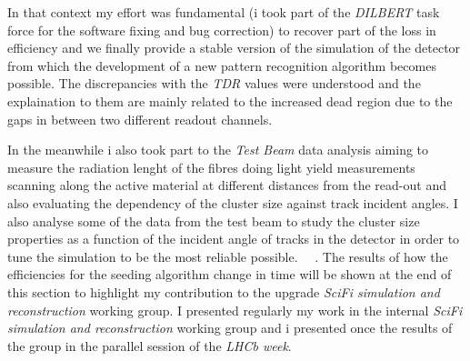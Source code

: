 \documentclass[paper=a4, fontsize=10pt]{scrartcl}
\numberwithin{equation}{section}		%
\numberwithin{figure}{section}			%
\numberwithin{table}{section}				%
\begin{document}
In that context my effort was fundamental (i took part of the \textit{DILBERT} task force for the software fixing and bug correction) to recover part of the loss in efficiency and we finally provide a stable version of the simulation of the detector from which the development of a new pattern recognition algorithm becomes possible. The discrepancies with the \textit{TDR} values were understood and the explaination to them are mainly related to the increased dead region due to the gaps in between two different readout channels.

In the meanwhile i also took part to the \textit{Test Beam} data analysis aiming to measure the radiation lenght of the fibres doing light yield measurements scanning along the active material at different distances from the read-out and also evaluating the dependency of the cluster size against track incident angles. I also analyse some of the data from the test beam to study the cluster size properties as a function of the incident angle of tracks in the detector in order to tune the simulation to be the most reliable possible. ~\cite{AnalysisOrsay}~\cite{LalTestBeam}.
The results of how the efficiencies for the seeding algorithm change in time will be shown at the end of this section to highlight my contribution to the upgrade \textit{SciFi simulation and reconstruction} working group. I presented regularly my work in the internal \textit{SciFi simulation and reconstruction} working group and i presented once the results of the group in the parallel session of the \textit{LHCb week}. 
\end{document}
